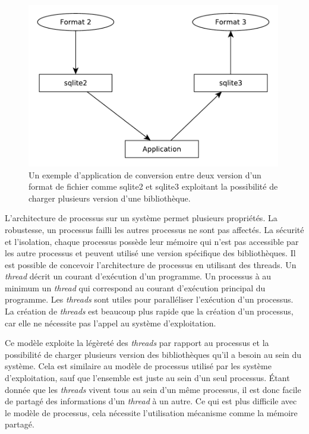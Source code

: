 \begin{figure}[ht]
  \includegraphics[width=30em]{figures/app_convert_v1_to_v2.pdf}
  \caption{Un exemple d'application de conversion entre deux version d'un format
  de fichier comme sqlite2 et sqlite3 exploitant la possibilité de charger plusieurs
  version d'une bibliothèque.}
\end{figure}

L'architecture de processus sur un système permet plusieurs propriétés. La
robustesse, un processus failli les autres processus ne sont pas affectés. La
sécurité et l'isolation, chaque processus possède leur mémoire qui n'est pas
accessible par les autre processus et peuvent utilisé une version spécifique
des bibliothèques. Il est possible de concevoir l'architecture de processus en
utilisant des threads.  Un \textit{thread} décrit un courant d'exécution d'un
programme. Un processus à au minimum un \textit{thread} qui correspond au
courant d'exécution principal du programme. Les \textit{threads} sont utiles
pour paralléliser l'exécution d'un processus. La création de \textit{threads}
est beaucoup plus rapide que la création d'un processus, car elle ne nécessite
pas l'appel au système d'exploitation.

Ce modèle exploite la légèreté des \textit{threads} par rapport au processus et
la possibilité de charger plusieurs version des bibliothèques qu'il a besoin au sein
du système. Cela est similaire au modèle de processus utilisé par les
système d'exploitation, sauf que l'ensemble est juste au sein d'un seul processus.
Étant donnée que les \textit{threads} vivent tous au sein d'un même processus,
il est donc facile de partagé des informations d'un \textit{thread} à un autre.
Ce qui est plus difficile avec le modèle de processus, cela nécessite l'utilisation
mécanisme comme la mémoire partagé.


